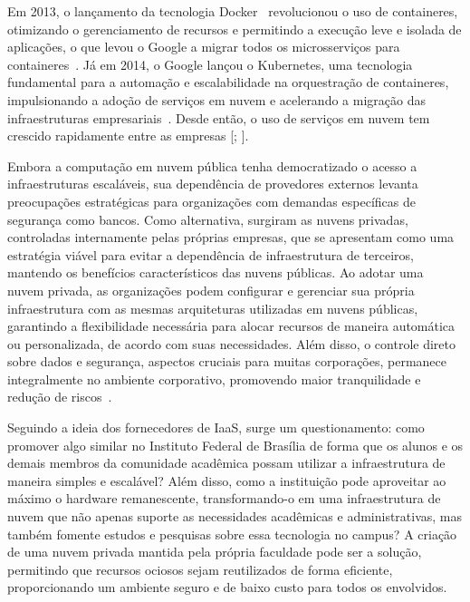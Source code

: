 Em 2013, o lançamento da tecnologia Docker~\citep{DockerDocumentation} revolucionou o uso de containeres, otimizando o gerenciamento de recursos e permitindo a execução leve e isolada de aplicações, o que levou o Google a migrar todos os microsserviços para containeres~\citep{HistoryOfContainers}. Já em 2014, o Google lançou o Kubernetes, uma tecnologia fundamental para a automação e escalabilidade na orquestração de containeres, impulsionando a adoção de serviços em nuvem e acelerando a migração das infraestruturas empresariais~\citep{CompaniesMigrateToAWS}. Desde então, o uso de serviços em nuvem tem crescido rapidamente entre as empresas [\citep{GrowthCompaniesInCloud_one}; \citep{GrowthCompaniesInCloud_two}].


Embora a computação em nuvem pública tenha democratizado o acesso a infraestruturas escaláveis, sua dependência de provedores externos levanta preocupações estratégicas para organizações com demandas específicas de segurança como bancos. Como alternativa, surgiram as nuvens privadas, controladas internamente pelas próprias empresas, que se apresentam como uma estratégia viável para evitar a dependência de infraestrutura de terceiros, mantendo os benefícios característicos das nuvens públicas. Ao adotar uma nuvem privada, as organizações podem configurar e gerenciar sua própria infraestrutura com as mesmas arquiteturas utilizadas em nuvens públicas, garantindo a flexibilidade necessária para alocar recursos de maneira automática ou personalizada, de acordo com suas necessidades. Além disso, o controle direto sobre dados e segurança, aspectos cruciais para muitas corporações, permanece integralmente no ambiente corporativo, promovendo maior tranquilidade e redução de riscos~\citep{privateCloudAdvantagesDisadvantages}.


Seguindo a ideia dos fornecedores de IaaS, surge um questionamento: como promover algo similar no Instituto Federal de Brasília de forma que os alunos e os demais membros da comunidade acadêmica possam utilizar a infraestrutura de maneira simples e escalável? Além disso, como a instituição pode aproveitar ao máximo o hardware remanescente, transformando-o em uma infraestrutura de nuvem que não apenas suporte as necessidades acadêmicas e administrativas, mas também fomente estudos e pesquisas sobre essa tecnologia no campus? A criação de uma nuvem privada mantida pela própria faculdade pode ser a solução, permitindo que recursos ociosos sejam reutilizados de forma eficiente, proporcionando um ambiente seguro e de baixo custo para todos os envolvidos.

